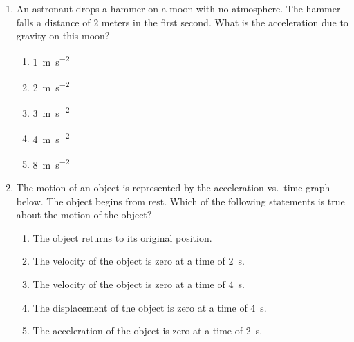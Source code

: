 \documentclass{../../../oss-classkick}
\begin{document}
\begin{multicols*}{2}
\begin{enumerate}[resume,leftmargin=18pt]
  \item An astronaut drops a hammer on a moon with no atmosphere. The hammer
    falls a distance of $2$ meters in the first second. What is the
    acceleration due to gravity on this moon?
    \begin{enumerate}[nosep,leftmargin=18pt,label=(\Alph*)]
    \item\SI{1}{\metre\per\second\squared}
    \item\SI{2}{\metre\per\second\squared}
    \item\SI{3}{\metre\per\second\squared}
    \item\SI{4}{\metre\per\second\squared}
    \item\SI{8}{\metre\per\second\squared}
    \end{enumerate}

  \item The motion of an object is represented by the acceleration vs.\ time
    graph below. The object begins from rest. Which of the following statements
    is true about the motion of the object?
    \begin{center}
    \end{center}
    \begin{enumerate}[nosep,leftmargin=18pt,label=(\Alph*)]
    \item The object returns to its original position.
    \item The velocity of the object is zero at a time of \SI{2}{\second}.
    \item The velocity of the object is zero at a time of \SI{4}{\second}.
    \item The displacement of the object is zero at a time of \SI{4}{\second}.
    \item The acceleration of the object is zero at a time of \SI{2}{\second}.
    \end{enumerate}
  \end{enumerate}
\end{multicols*}
\end{document}
